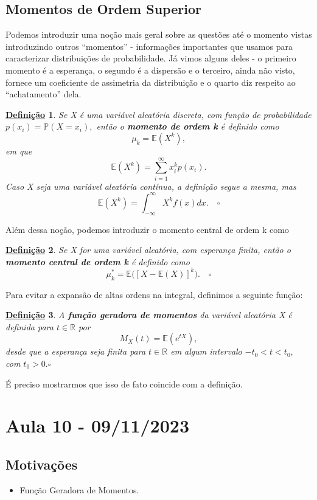 \documentclass{article}
\newtheorem*{def*}{\underline{Defini\c c\~ao}}
\begin{document}
\subsection{Momentos de Ordem Superior}
  Podemos introduzir uma noção mais geral sobre as questões até o momento vistas introduzindo outros ``momentos'' - informações importantes que usamos 
para caracterizar distribuições de probabilidade. Já vimos alguns deles - o primeiro momento é a esperança, o segundo é a dispersão e o terceiro, ainda não
visto, fornece um coeficiente de assimetria da distribuição e o quarto diz respeito ao ``achatamento'' dela.
  \begin{def*}
  Se X é uma variável aleatória discreta, com função de probabilidade \(p(x_{i}) = \mathbb{P}(X = x_{i}),\) então o \textbf{momento de ordem k}
é definido como 
  \[
    \mu_{k} = \mathbb{E}(X^{k}),
  \]
  em que 
  \[
    \mathbb{E}(X^{k}) = \sum\limits_{i=1}^{\infty}x_{i}^{k}p(x_{i}).
  \]
  Caso X seja uma variável aleatória contínua, a definição segue a mesma, mas 
  \[
    \mathbb{E}(X^{k}) = \int_{-\infty}^{\infty}X^{k}f(x)dx.\quad\square
  \]
  \end{def*}
  Além dessa noção, podemos introduzir o momento central de ordem k como
 \begin{def*}
   Se X for uma variável aleatória, com esperança finita, então o \textbf{momento central de ordem k} é definido como 
   \[
     \mu_{k}^{*} = \mathbb{E}\biggl([X-\mathbb{E}(X)]^{k}\biggr).\quad\square
   \]
 \end{def*}
 Para evitar a expansão de altas ordens na integral, definimos a seguinte função:
\begin{def*}
  A \textbf{função geradora de momentos} da variável aleatória X é definida para \(t\in \mathbb{R}\) por 
  \[
    M_{X}(t) = \mathbb{E}(e^{tX}),
  \]
  desde que a esperança seja finita para \(t\in \mathbb{R}\) em algum intervalo \(-t_{0} < t < t_{0},\) com \(t_{0} > 0.\square\)
\end{def*}
  É preciso mostrarmos que isso de fato coincide com a definição.
\newpage

\section{Aula 10 - 09/11/2023}
\subsection{Motivações}
\begin{itemize}
  \item Função Geradora de Momentos.
\end{itemize}
\end{document}
